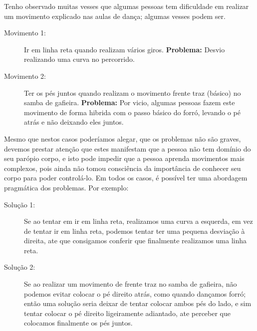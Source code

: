 Tenho observado muitas vesses que algumas pessoas tem dificuldade
em realizar um movimento explicado nas aulas de dança;
algumas vesses podem ser.
\begin{description}
\item[Movimento 1:] Ir em linha reta quando realizam vários giros.
\textbf{Problema:} Desvio realizando uma curva no percorrido.
\item[Movimento 2:] Ter os pés juntos quando realizam o movimento frente traz (básico) no samba de gafieira.
\textbf{Problema:} Por vicio, algumas pessoas fazem este movimento de forma hibrida com o passo básico do forró,
levando o pé atrás e não deixando eles juntos.\\
\end{description} 

Mesmo que nestos casos poderíamos alegar, que os problemas não são graves,
devemos prestar atenção que estes manifestam que a pessoa não tem domínio do seu parópio corpo,
e isto pode impedir que a pessoa aprenda movimentos mais complexos,
pois ainda não tomou consciência da importância de conhecer seu corpo para poder controlá-lo.
Em todos os casos, é possível ter uma abordagem pragmática dos problemas.
Por exemplo:
\begin{description}
\item[Solução 1:] Se ao tentar em ir em linha reta, realizamos uma curva a esquerda,
em vez de tentar ir em linha reta, podemos tentar ter uma pequena desviação à direita,
ate que consigamos conferir que finalmente realizamos uma linha reta.
\item[Solução 2:] Se ao realizar um movimento de frente traz no samba de gafieira,
não podemos evitar colocar o pé direito atrás,
como quando dançamos forró; 
então uma solução seria deixar de tentar colocar ambos pés do lado,
e sim tentar colocar o pé direito ligeiramente adiantado,
ate perceber que colocamos finalmente os pés juntos.
\end{description} 




